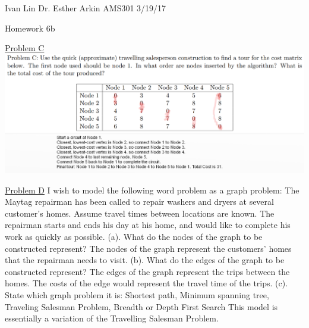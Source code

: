 \documentclass{article}
\begin{document}
Ivan Lin\newline{}
Dr. Esther Arkin\newline{}
AMS301\newline{}
3/19/17

\begin{center}
  Homework 6b
\end{center}

\underline{Problem C}\newline{}
\includegraphics[width=\textwidth]{testams303.png}

\underline{Problem D}\newline{}
I wish to model the following word problem as a graph problem: The Maytag repairman has been called to repair washers and dryers at several customer’s homes. Assume travel times between locations are known. The repairman starts and ends his day at his home, and would like to complete his work as quickly as possible.\newline{}
(a). What do the nodes of the graph to be constructed represent?\newline{}
The nodes of the graph represent the customers' homes that the repairman needs to visit.\newline{}
(b). What do the edges of the graph to be constructed represent?\newline{}
The edges of the graph represent the trips between the homes. The costs of the edge would represent the travel time of the trips.\newline{} 
(c). State which graph problem it is: Shortest path, Minimum spanning tree, Traveling Salesman Problem,
Breadth or Depth First Search\newline{}
This model is essentially a variation of the Travelling Salesman Problem.\newline{}
\end{document}
